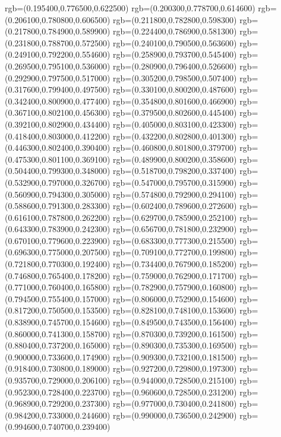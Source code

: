 {{		 rgb=(0.195400,0.776500,0.622500)
		 rgb=(0.200300,0.778700,0.614600)
		 rgb=(0.206100,0.780800,0.606500)
		 rgb=(0.211800,0.782800,0.598300)
		 rgb=(0.217800,0.784900,0.589900)
		 rgb=(0.224400,0.786900,0.581300)
		 rgb=(0.231800,0.788700,0.572500)
		 rgb=(0.240100,0.790500,0.563600)
		 rgb=(0.249100,0.792200,0.554600)
		 rgb=(0.258900,0.793700,0.545400)
		 rgb=(0.269500,0.795100,0.536000)
		 rgb=(0.280900,0.796400,0.526600)
		 rgb=(0.292900,0.797500,0.517000)
		 rgb=(0.305200,0.798500,0.507400)
		 rgb=(0.317600,0.799400,0.497500)
		 rgb=(0.330100,0.800200,0.487600)
		 rgb=(0.342400,0.800900,0.477400)
		 rgb=(0.354800,0.801600,0.466900)
		 rgb=(0.367100,0.802100,0.456300)
		 rgb=(0.379500,0.802600,0.445400)
		 rgb=(0.392100,0.802900,0.434400)
		 rgb=(0.405000,0.803100,0.423300)
		 rgb=(0.418400,0.803000,0.412200)
		 rgb=(0.432200,0.802800,0.401300)
		 rgb=(0.446300,0.802400,0.390400)
		 rgb=(0.460800,0.801800,0.379700)
		 rgb=(0.475300,0.801100,0.369100)
		 rgb=(0.489900,0.800200,0.358600)
		 rgb=(0.504400,0.799300,0.348000)
		 rgb=(0.518700,0.798200,0.337400)
		 rgb=(0.532900,0.797000,0.326700)
		 rgb=(0.547000,0.795700,0.315900)
		 rgb=(0.560900,0.794300,0.305000)
		 rgb=(0.574800,0.792900,0.294100)
		 rgb=(0.588600,0.791300,0.283300)
		 rgb=(0.602400,0.789600,0.272600)
		 rgb=(0.616100,0.787800,0.262200)
		 rgb=(0.629700,0.785900,0.252100)
		 rgb=(0.643300,0.783900,0.242300)
		 rgb=(0.656700,0.781800,0.232900)
		 rgb=(0.670100,0.779600,0.223900)
		 rgb=(0.683300,0.777300,0.215500)
		 rgb=(0.696300,0.775000,0.207500)
		 rgb=(0.709100,0.772700,0.199800)
		 rgb=(0.721800,0.770300,0.192400)
		 rgb=(0.734400,0.767900,0.185200)
		 rgb=(0.746800,0.765400,0.178200)
		 rgb=(0.759000,0.762900,0.171700)
		 rgb=(0.771000,0.760400,0.165800)
		 rgb=(0.782900,0.757900,0.160800)
		 rgb=(0.794500,0.755400,0.157000)
		 rgb=(0.806000,0.752900,0.154600)
		 rgb=(0.817200,0.750500,0.153500)
		 rgb=(0.828100,0.748100,0.153600)
		 rgb=(0.838900,0.745700,0.154600)
		 rgb=(0.849500,0.743500,0.156400)
		 rgb=(0.860000,0.741300,0.158700)
		 rgb=(0.870300,0.739200,0.161500)
		 rgb=(0.880400,0.737200,0.165000)
		 rgb=(0.890300,0.735300,0.169500)
		 rgb=(0.900000,0.733600,0.174900)
		 rgb=(0.909300,0.732100,0.181500)
		 rgb=(0.918400,0.730800,0.189000)
		 rgb=(0.927200,0.729800,0.197300)
		 rgb=(0.935700,0.729000,0.206100)
		 rgb=(0.944000,0.728500,0.215100)
		 rgb=(0.952300,0.728400,0.223700)
		 rgb=(0.960600,0.728500,0.231200)
		 rgb=(0.968900,0.729200,0.237300)
		 rgb=(0.977000,0.730400,0.241800)
		 rgb=(0.984200,0.733000,0.244600)
		 rgb=(0.990000,0.736500,0.242900)
		 rgb=(0.994600,0.740700,0.239400)
}}
